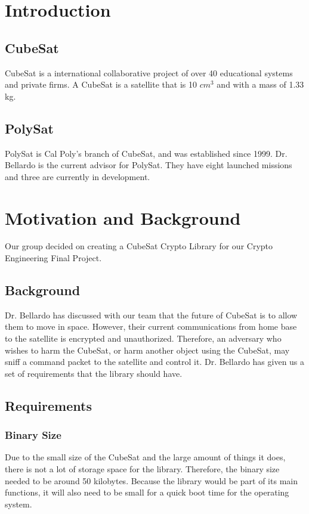 \documentclass[12pt]{article}
\begin{document}
\begin{multicols}{2}
\section{Introduction}
\subsection{CubeSat}
CubeSat is a international collaborative project of over 40 educational systems and private firms. A CubeSat is a satellite that is 10 $cm^{3}$ and with a mass of 1.33 kg. \cite{CubeSat}
\subsection{PolySat}
PolySat is Cal Poly’s branch of CubeSat, and was established since 1999. Dr. Bellardo is the current advisor for PolySat. They have eight launched missions and three are currently in development. \cite{PolySat}
\section{Motivation and Background}
Our group decided on creating a CubeSat Crypto Library for our Crypto Engineering Final Project. 
\subsection{Background}
Dr. Bellardo has discussed with our team that the future of CubeSat is to allow them to move in space. However, their current communications from home base to the satellite is encrypted and unauthorized.  Therefore, an adversary who wishes to harm the CubeSat, or harm another object using the CubeSat, may sniff a command packet to the satellite and control it. Dr. Bellardo has given us a set of requirements that the library should have.
\subsection{Requirements}
\subsubsection{Binary Size}
Due to the small size of the CubeSat and the large amount of things it does, there is not a lot of storage space for the library. Therefore, the binary size needed to be around 50 kilobytes. Because the library would be part of its main functions, it will also need to be small for a quick boot time for the operating system. 

\end{multicols}
\end{document}
